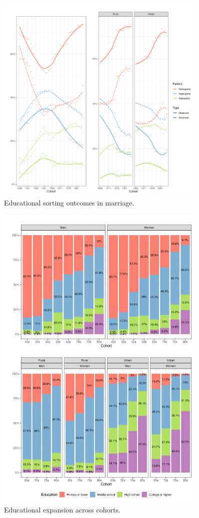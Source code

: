 
\begin{figure}[H]
    \centering
    \includegraphics[width=0.9\textwidth]{chapters/chapter4/figures/trends.png}
    \caption{Educational sorting outcomes in marriage.}
    \label{fig:trends_edu_sorting_marriage}
\end{figure}

\begin{figure}[H]
    \centering
    \includegraphics[width=0.9\textwidth]{chapters/chapter4/figures/edu_comp.png}
    \caption{Educational expansion across cohorts.}
    \label{fig:edu_comp}
\end{figure}

